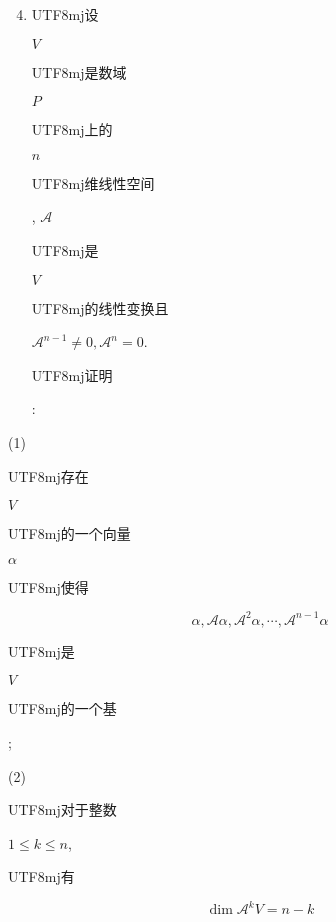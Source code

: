 \documentclass[10pt]{article}
\begin{document}
\begin{enumerate}
  \setcounter{enumi}{3}
  \item \begin{CJK}{UTF8}{mj}设\end{CJK} $V$ \begin{CJK}{UTF8}{mj}是数域\end{CJK} $P$ \begin{CJK}{UTF8}{mj}上的\end{CJK} $n$ \begin{CJK}{UTF8}{mj}维线性空间\end{CJK}, $\mathscr{A}$ \begin{CJK}{UTF8}{mj}是\end{CJK} $V$ \begin{CJK}{UTF8}{mj}的线性变换且\end{CJK} $\mathscr{A}^{n-1} \neq 0, \mathscr{A}^{n}=0$. \begin{CJK}{UTF8}{mj}证明\end{CJK}:
\end{enumerate}
(1) \begin{CJK}{UTF8}{mj}存在\end{CJK} $V$ \begin{CJK}{UTF8}{mj}的一个向量\end{CJK} $\alpha$ \begin{CJK}{UTF8}{mj}使得\end{CJK}
$$
\alpha, \mathscr{A} \alpha, \mathscr{A}^{2} \alpha, \cdots, \mathscr{A}^{n-1} \alpha
$$
\begin{CJK}{UTF8}{mj}是\end{CJK} $V$ \begin{CJK}{UTF8}{mj}的一个基\end{CJK};

(2) \begin{CJK}{UTF8}{mj}对于整数\end{CJK} $1 \leqslant k \leqslant n$, \begin{CJK}{UTF8}{mj}有\end{CJK}
$$
\operatorname{dim} \mathscr{A}^{k} V=n-k
$$
\end{document}

